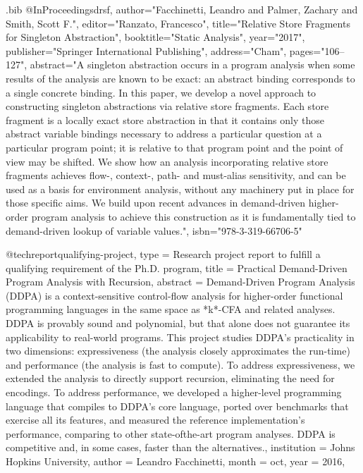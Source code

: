 \documentclass[12pt, oneside]{book}
\begin{document}
\begin{filecontents*}{\jobname.bib}
@InProceedings{drsf,
  author="Facchinetti, Leandro
  and Palmer, Zachary
  and Smith, Scott F.",
  editor="Ranzato, Francesco",
  title="Relative Store Fragments for Singleton Abstraction",
  booktitle="Static Analysis",
  year="2017",
  publisher="Springer International Publishing",
  address="Cham",
  pages="106--127",
  abstract="A singleton abstraction occurs in a program analysis when some results of the analysis are known to be exact: an abstract binding corresponds to a single concrete binding. In this paper, we develop a novel approach to constructing singleton abstractions via relative store fragments. Each store fragment is a locally exact store abstraction in that it contains only those abstract variable bindings necessary to address a particular question at a particular program point; it is relative to that program point and the point of view may be shifted. We show how an analysis incorporating relative store fragments achieves flow-, context-, path- and must-alias sensitivity, and can be used as a basis for environment analysis, without any machinery put in place for those specific aims. We build upon recent advances in demand-driven higher-order program analysis to achieve this construction as it is fundamentally tied to demand-driven lookup of variable values.",
  isbn="978-3-319-66706-5"
}

@techreport{qualifying-project,
	type = {Research project report to fulfill a qualifying requirement of the {Ph}.{D}. program},
	title = {Practical {Demand}-{Driven} {Program} {Analysis} with {Recursion}},
	abstract = {Demand-Driven Program Analysis (DDPA) is a context-sensitive control-ﬂow analysis for higher-order functional programming languages in the same space as *k*-CFA and related analyses. DDPA is provably sound and polynomial, but that alone does not guarantee its applicability to real-world programs. This project studies DDPA’s practicality in two dimensions: expressiveness (the analysis closely approximates the run-time) and performance (the analysis is fast to compute). To address expressiveness, we extended the analysis to directly support recursion, eliminating the need for encodings. To address performance, we developed a higher-level programming language that compiles to DDPA’s core language, ported over benchmarks that exercise all its features, and measured the reference implementation’s performance, comparing to other state-ofthe-art program analyses. DDPA is competitive and, in some cases, faster than the alternatives.},
	institution = {Johns Hopkins University},
	author = {{Leandro Facchinetti}},
	month = oct,
	year = {2016},
}


\end{filecontents*}
\end{document}
